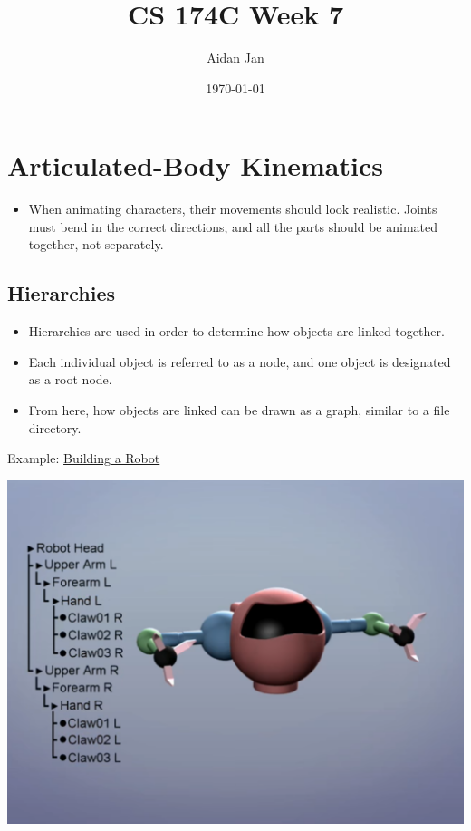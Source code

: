 \documentclass{article}
\title{CS 174C Week 7}
\author{Aidan Jan}
\date{\today}
\begin{document}
\maketitle
\section*{Articulated-Body Kinematics}
\begin{itemize}
    \item When animating characters, their movements should look realistic.  Joints must bend in the correct directions, and all the parts should be animated together, not separately.
\end{itemize}

\subsection*{Hierarchies}
\begin{itemize}
    \item Hierarchies are used in order to determine how objects are linked together.
    \item Each individual object is referred to as a node, and one object is designated as a root node.
    \item From here, how objects are linked can be drawn as a graph, similar to a file directory.
\end{itemize}
Example: \href{https://www.youtube.com/watch?v=q54fbMvl3GE}{Building a Robot}
\begin{center}
    \includegraphics*[scale=0.3]{W7_1.png}
\end{center}
\end{document}

